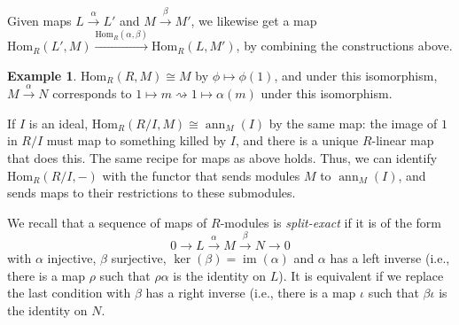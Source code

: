 \documentclass{amsart}[12pt]
\def\ann{\operatorname{ann}}
\def\image{\operatorname{im}}
\def\im{\image}
\def\ker{\operatorname{ker}}
\newcommand{\Hom}{\mathrm{Hom}}
\numberwithin{equation}{section}
\theoremstyle{plain} %
\theoremstyle{definition}
\newtheorem{ex}[equation]{Example}
\theoremstyle{remark}
\newcommand{\xra}[1]{\xrightarrow{#1}}
\begin{document}
Given maps $L \xrightarrow{\alpha} L'$ and $M \xrightarrow{\beta} M'$, we likewise get a map $\Hom_R(L',M) \xrightarrow{\Hom_R(\alpha,\beta)} \Hom_R(L,M')$, by combining the constructions above.

\begin{ex}
$\Hom_R(R,M)\cong M$ by $\phi\mapsto \phi(1)$, and under this isomorphism, $M \xrightarrow{\alpha} N$ corresponds to $1 \mapsto m \rightsquigarrow 1 \mapsto \alpha(m)$ under this isomorphism.

If $I$ is an ideal, $\Hom_R(R/I,M)\cong \ann_M(I)$ by the same map: the image of $1$ in $R/I$ must map to something killed by $I$, and there is a unique $R$-linear map that does this. The same recipe for maps as above holds. Thus, we can identify $\Hom_R(R/I,-)$ with the functor that sends modules $M$ to $\ann_M(I)$, and sends maps to their restrictions to these submodules.
\end{ex}

We recall that a sequence of maps of $R$-modules is \emph{split-exact} if it is of the form
\[ 0 \to L \xra{\alpha} M \xra{\beta} N \to 0\]
with $\alpha$ injective, $\beta$ surjective, $\ker(\beta)=\im(\alpha)$ and $\alpha$ has a left inverse (i.e., there is a map $\rho$ such that $\rho \alpha$ is the identity on $L$). It is equivalent if we replace the last condition with $\beta$ has a right inverse (i.e., there is a map $\iota$ such that $\beta \iota$ is the identity on $N$.
\end{document}
